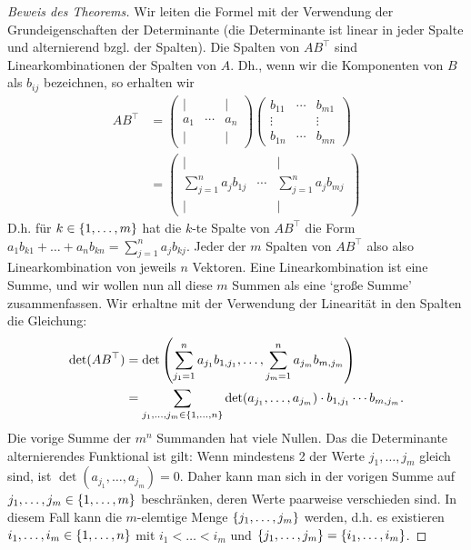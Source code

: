 \begin{proof}[Beweis des Theorems]
	Wir leiten die Formel mit der Verwendung der Grundeigenschaften der Determinante (die Determinante ist linear in jeder Spalte und alternierend bzgl. der Spalten). Die Spalten von $A B^\top$ sind Linearkombinationen der Spalten von $A$. Dh., wenn wir die Komponenten von $B$ als $b_{ij}$ bezeichnen, so erhalten wir 
	\begin{align*}
		AB^\top &= \begin{pmatrix}
			| && | \\
			a_1 & \cdots & a_n \\
			| && |
		\end{pmatrix} \begin{pmatrix}
			b_{11} & \cdots & b_{m1} \\
			\vdots &  & \vdots \\
			b_{1n} & \cdots & b_{mn}
		\end{pmatrix} \\
		&= \begin{pmatrix}
			| && | \\
			\sum_{j=1}^n a_jb_{1j} & \cdots & \sum_{j=1}^n a_jb_{mj} \\
			| && |
		\end{pmatrix}		
	\end{align*}
	D.h. für $ k \in \{ 1,\ldots,m \} $ hat die $ k $-te Spalte von $ AB^\top $ die Form $ a_1b_{k1} + \ldots + a_nb_{kn} = \sum_{j=1}^{n} a_jb_{kj} $. Jeder der $m$ Spalten von $A B^\top$ also also Linearkombination von jeweils $n$ Vektoren. Eine Linearkombination ist eine Summe, und wir wollen nun all diese $m$ Summen als eine `große Summe'  zusammenfassen. Wir erhaltne mit der Verwendung der Linearität in den Spalten die Gleichung: 
	\begin{align*}
		\det(AB^\top) &= \det\left( \sum_{j_1=1}^{n} a_{j_1}b_{1,j_1}, \ldots, \sum_{j_m=1}^{n} a_{j_m}b_{m,j_m} \right) \\
		&= \sum_{j_1, \ldots, j_m \in \{ 1,\ldots,n \}} \det(a_{j_1}, \ldots, a_{j_m}) \cdot b_{1,j_1} \cdots b_{m,j_m}.
	\end{align*}
	Die vorige Summe der $m^n$ Summanden hat viele Nullen. 
	Das die Determinante alternierendes Funktional ist gilt: Wenn mindestens 2 der Werte $ j_1, \ldots, j_m $ gleich sind, ist $ \det(a_{j_1}, \ldots, a_{j_m}) = 0 $. Daher kann man sich in der vorigen Summe auf $ j_1, \ldots, j_m \in \{ 1,\ldots,m \} $ beschränken, deren Werte paarweise verschieden sind. In diesem Fall kann die $ m $-elemtige Menge $ \{ j_1,\ldots,j_m \} $  werden, d.h. es existieren $ i_1, \ldots, i_m \in \{ 1,\ldots,n \} $ mit $ i_1 < \ldots < i_m $ und $ \{ j_1,\ldots,j_m \} = \{ i_1,\ldots,i_m \} $.
	

\end{proof}
